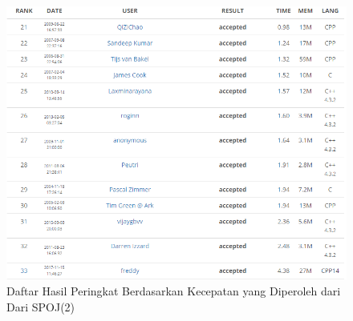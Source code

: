   \begin{figure}[H]
  \centering
  	\includegraphics[scale=0.55]{images/lampiran/rankdiatas2.png}
  	\caption{Daftar Hasil Peringkat Berdasarkan Kecepatan yang Diperoleh dari Dari SPOJ(2)}
  	\label{fig:per2}
  \end{figure}
  
